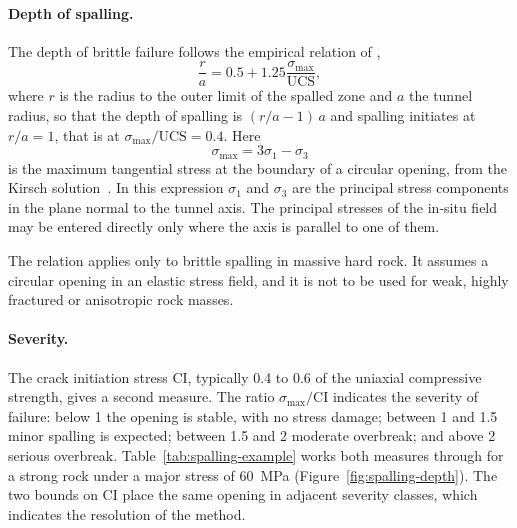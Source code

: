 \paragraph{Depth of spalling.}
The depth of brittle failure follows the empirical relation of
\citet{martin1999spalling},
\[
\frac{r}{a} = 0.5 + 1.25 \frac{\sigma_{\max}}{\mathrm{UCS}},
\]
where $r$ is the radius to the outer limit of the spalled zone and $a$ the
tunnel radius, so that the depth of spalling is $(r/a-1)\,a$ and spalling
initiates at $r/a = 1$, that is at $\sigma_{\max}/\mathrm{UCS} = 0.4$. Here
\[
\sigma_{\max} = 3\sigma_1 - \sigma_3
\]
is the maximum tangential stress at the boundary of a circular opening, from
the Kirsch solution~\citep{kirsch1898}. In this expression \(\sigma_1\) and
\(\sigma_3\) are the principal stress components in the plane normal to the
tunnel axis. The principal stresses of the in-situ field may be entered
directly only where the axis is parallel to one of them.

The relation applies only to brittle spalling in massive hard rock. It
assumes a circular opening in an elastic stress field, and it is not to be
used for weak, highly fractured or anisotropic rock masses.

\paragraph{Severity.}
The crack initiation stress CI, typically 0.4 to 0.6 of the uniaxial
compressive strength, gives a second measure. The ratio
\(\sigma_{\max}/\mathrm{CI}\) indicates the severity of failure: below 1 the
opening is stable, with no stress damage; between 1 and 1.5 minor spalling is
expected; between 1.5 and 2 moderate overbreak; and above 2 serious
overbreak. Table~\ref{tab:spalling-example} works both measures through for a
strong rock under a major stress of 60~MPa
(Figure~\ref{fig:spalling-depth}). The two bounds on CI place the
same opening in adjacent severity classes, which indicates the
resolution of the method.

